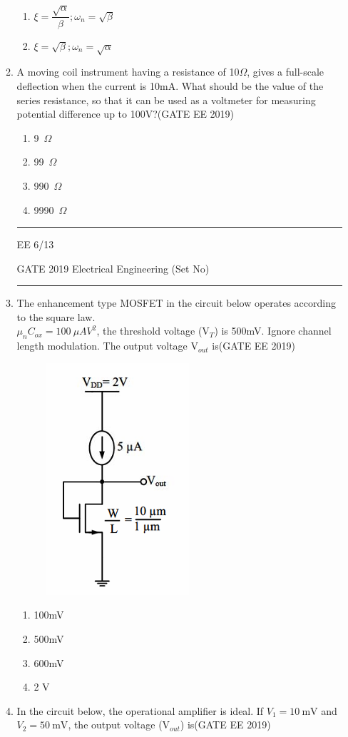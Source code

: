 \documentclass[a4paper,10pt]{exam}
\theoremstyle{remark}
\begin{document}
\begin{enumerate}
\begin{enumerate}[label=\arabic*.]
\begin{enumerate}
\item $\xi = \dfrac{\sqrt{\alpha}}{\beta};\omega_n = \sqrt{\beta}$
\item$\xi = \sqrt{\beta};\omega_n = \sqrt{\alpha}$
\end{enumerate}
\item A moving coil instrument having a resistance of 10$\Omega$, gives a full-scale deflection when the current is 10mA. What should be the value of the series resistance, so that it can be used as a voltmeter for measuring potential difference up to 100V?\hfill{(GATE EE 2019)}
\begin{multicols}{4}
\begin{enumerate}
    \item 9~$\Omega$
    \item 99~$\Omega$
    \item 990~$\Omega$
    \item 9990~$\Omega$
\end{enumerate}
\end{multicols}
\vfill
\noindent\rule{\linewidth}{0.4pt}
EE \hfill 6/13
\newpage
\raggedright{GATE 2019 Electrical Engineering (Set No)}
\noindent\rule{\linewidth}{0.4pt}


\item The enhancement type MOSFET in the circuit below operates according to the square law.\\
$\mu_n C_{ox} = 100~\mu A V^2$, the threshold voltage (V$_T$) is 500mV. Ignore channel length modulation. The output voltage V$_{out}$ is\hfill{(GATE EE 2019)}
\begin{figure}[H]
    \centering
    \includegraphics[width=0.3\columnwidth]{figs/Q 33.png}\caption{}     \label{fig:placeholder}
\end{figure}

\begin{multicols}{4}
\begin{enumerate}
    \item 100mV
    \item 500mV
    \item 600mV
    \item 2 V
\end{enumerate}
\end{multicols}
\item In the circuit below, the operational amplifier is ideal. If $V_1 = 10~\text{mV}$ and $V_2 = 50~\text{mV}$, the output voltage (V$_{out}$) is\hfill{(GATE EE 2019)}


\end{enumerate}
\end{enumerate}
\end{document}
